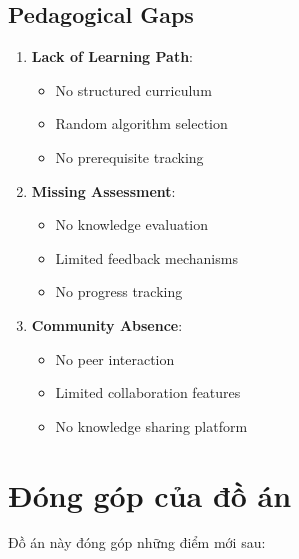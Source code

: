 \subsection{Pedagogical Gaps}
\label{subsec:pedagogical-gaps}

\begin{enumerate}
    \item \textbf{Lack of Learning Path}:
    \begin{itemize}
        \item No structured curriculum
        \item Random algorithm selection
        \item No prerequisite tracking
    \end{itemize}
    
    \item \textbf{Missing Assessment}:
    \begin{itemize}
        \item No knowledge evaluation
        \item Limited feedback mechanisms
        \item No progress tracking
    \end{itemize}
    
    \item \textbf{Community Absence}:
    \begin{itemize}
        \item No peer interaction
        \item Limited collaboration features
        \item No knowledge sharing platform
    \end{itemize}
\end{enumerate}

\section{Đóng góp của đồ án}
\label{sec:contribution}

Đồ án này đóng góp những điểm mới sau:


